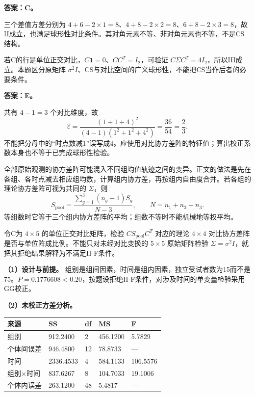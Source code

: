 
\textbf{答案：C。}

三个差值方差分别为 \(4+6-2\times1=8\)、\(4+8-2\times2=8\)、\(6+8-2\times3=8\)，故II成立，也满足球形性对比条件。其对角元素不等、非对角元素也不等，不是CS结构。

若C的行是单位正交对比，\(C\mathbf1=0\)、\(CC^T=I_2\)，可验证 \(C\Sigma C^T=4I_2\)，所以III成立。本题区分原矩阵 \(\sigma^2I\)、CS与对比空间的广义球形性，不能把CS当作后者的必要条件。





\textbf{答案：E。}

共有 \(4-1=3\) 个对比维度，故 \[\hat\varepsilon=\frac{(1+1+4)^2}{(4-1)(1^2+1^2+4^2)}=\frac{36}{54}=\frac23.\] 不能把分母中的``时点数减1''误写成4。应使用对比协方差阵的特征值；算出校正系数本身也不等于已完成球形性检验。





全部原始观测的协方差阵可能混入不同组均值轨迹之间的变异。正文的做法是先在各组、各时点减去相应组均数，计算组内协方差，再按组内自由度合并。若各组的理论协方差阵可视为共同的 \(\Sigma\)，则 \[S_{\mathrm{pool}}=\frac{\sum_{g=1}^{3}(n_g-1)S_g}{N-3},\qquad N=n_1+n_2+n_3.\] 等组数时它等于三个组内协方差阵的平均；组数不等时不能机械地等权平均。

令C为 \(4\times5\) 的单位正交对比矩阵，检验 \(CS_{\mathrm{pool}}C^T\) 对应的理论 \(4\times4\) 对比协方差阵是否与单位阵成比例。不能只对未经对比变换的 \(5\times5\) 原始矩阵检验 \(\Sigma=\sigma^2I\)，就把其拒绝结果解释为不满足H-F条件。





\textbf{（1）设计与前提。} 组别是组间因素，时间是组内因素，独立受试者数为15而不是75。\(P=0.1776608<0.20\)，按题设拒绝H-F条件，对涉及时间的单变量检验采用GG校正。

\textbf{（2）未校正方差分析。}

\begin{center}\small\setlength{\tabcolsep}{5pt}\renewcommand{\arraystretch}{1.18}\begin{tabular}{@{}lllll@{}}
\toprule
来源 & SS & df & MS & F \\
\midrule

组别 & 912.2400 & 2 & 456.1200 & 5.7829 \\
个体间误差 & 946.4800 & 12 & 78.8733 & --- \\
时间 & 2336.4533 & 4 & 584.1133 & 106.5576 \\
组别×时间 & 837.6267 & 8 & 104.7033 & 19.1006 \\
个体内误差 & 263.1200 & 48 & 5.4817 & --- \\
\bottomrule\end{tabular}\end{center}

